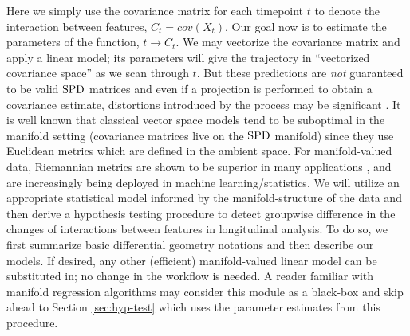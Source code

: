 Here we simply use the covariance matrix for each timepoint $t$ to denote the interaction between features, 
$C_t = cov(X_t)$. 
Our goal now is to estimate the parameters of the function, $t \to C_t$. 
%
%
We may vectorize the covariance matrix and apply a linear model; its parameters
will give the trajectory in ``vectorized covariance space'' as we scan through $t$. 
But these predictions are {\em not} guaranteed to be valid  $\text{SPD}$ matrices and even if a projection is performed to obtain a covariance estimate, distortions introduced by the process may be significant \cite{fletcher2013geodesic}.
It is well known that classical vector space models tend to be suboptimal 
in the manifold setting (covariance matrices live on the $\text{SPD}$ manifold)
since they use Euclidean metrics which are defined in the ambient space. For manifold-valued data, Riemannian metrics are shown to be superior in many applications 
\cite{fletcher2007riemannian,banerjee2015nonlinear,jayasumanakernel,tuzel2007human}, 
%
and are increasingly being deployed in machine learning/statistics. 
We will utilize an appropriate statistical model informed by the manifold-structure of the data and 
then derive a hypothesis 
testing procedure to detect groupwise difference in the changes of interactions between features in longitudinal analysis.
%
To do so, we first summarize basic differential geometry notations \cite{do1992riemannian,lee2012introduction} and 
then describe our models. If desired,
any other (efficient) manifold-valued linear model \cite{fletcher2013geodesic} can be substituted in; no 
change in the workflow is needed. A reader familiar with manifold regression algorithms may consider this module as a black-box and skip ahead to
Section \ref{sec:hyp-test} which uses the parameter estimates from this procedure. 

